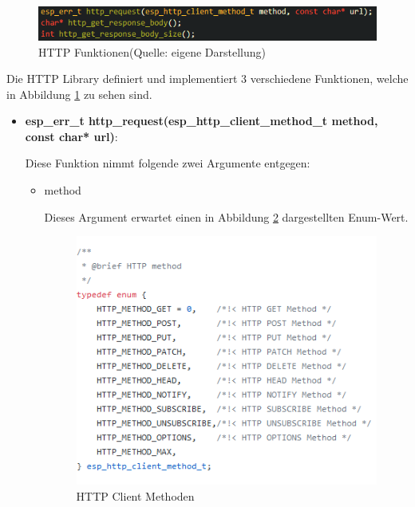 \begin{figure}[H]
    \begin{center}
        \includegraphics[scale=1]{images/http_functions.png}
        \caption{HTTP Funktionen(Quelle: eigene Darstellung)}
        \label{abb:http_functions}
    \end{center}    
\end{figure}

Die HTTP Library definiert und implementiert 3 verschiedene Funktionen, welche in  Abbildung \ref{abb:http_functions} zu sehen sind.

\begin{itemize}
    \item \textbf{esp\_err\_t http\_request(esp\_http\_client\_method\_t method, const char* url)}:

    Diese Funktion nimmt folgende zwei Argumente entgegen:

    \begin{itemize}
        \item method
        
        Dieses Argument erwartet einen in Abbildung \ref{abb:http_client_methods} dargestellten Enum-Wert.

        \begin{figure}[H]
            \begin{center}
                \includegraphics[scale=1]{images/http_client_methods.png}
                \caption{HTTP Client Methoden}%
                \label{abb:http_client_methods}
            \end{center}    
        \end{figure}


\end{itemize}
\end{itemize}
